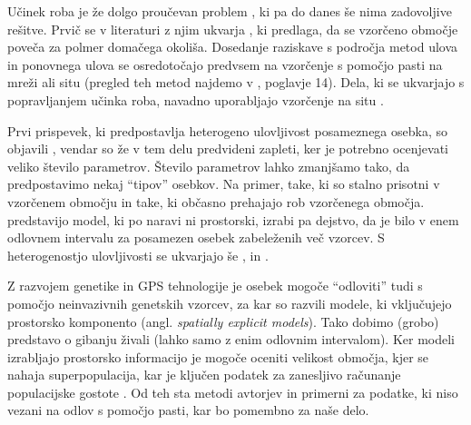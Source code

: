 \documentclass[a4paper]{article}
\begin{document}
Učinek roba je že dolgo proučevan problem \citep{efford2004}, ki pa do danes še nima zadovoljive rešitve. Prvič se v literaturi z njim ukvarja \citet{dice1938, dice1941}, ki predlaga, da se vzorčeno območje poveča za polmer domačega okoliša. Dosedanje raziskave s področja metod ulova in ponovnega ulova se osredotočajo predvsem na vzorčenje s pomočjo pasti na mreži ali situ (pregled teh metod najdemo v \citet{williams2002}, poglavje 14). Dela, ki se ukvarjajo s popravljanjem učinka roba, navadno uporabljajo vzorčenje na situ \citep{parmenter-n-etal2003}. %

Prvi prispevek, ki predpostavlja heterogeno ulovljivost posameznega osebka, so objavili \citet{otisetal1978}, vendar so že v tem delu predvideni zapleti, ker je potrebno ocenjevati veliko število parametrov. Število parametrov lahko zmanjšamo tako, da predpostavimo nekaj ``tipov'' osebkov. Na primer, take, ki so stalno prisotni v vzorčenem območju in take, ki občasno prehajajo rob vzorčenega območja. \citet{miller2005} predstavijo model, ki po naravi ni prostorski, izrabi pa dejstvo, da je bilo v enem odlovnem intervalu za posamezen osebek zabeleženih več vzorcev. S heterogenostjo ulovljivosti se ukvarjajo še \citet{burnham-n-overton1978}, \citet{chao1988} in \citet{pledger-n-2005}.

Z razvojem genetike in GPS tehnologije je osebek mogoče ``odloviti'' tudi s pomočjo neinvazivnih genetskih vzorcev, za kar so razvili modele, ki vključujejo prostorsko komponento (angl. \emph{spatially explicit models}). Tako dobimo (grobo) predstavo o gibanju živali (lahko samo z enim odlovnim intervalom). Ker modeli izrabljajo prostorsko informacijo je mogoče oceniti velikost območja, kjer se nahaja superpopulacija, kar je ključen podatek za zanesljivo računanje populacijske gostote \citep{gardneretal2009, royleetal2011, efford2011, borchers2012, royle-et-al-2013}. 
Od teh sta metodi avtorjev \citet{royleetal2011} in \citet{efford2011} primerni za podatke, ki niso vezani na odlov s pomočjo pasti, kar bo pomembno za naše delo.

\end{document}
